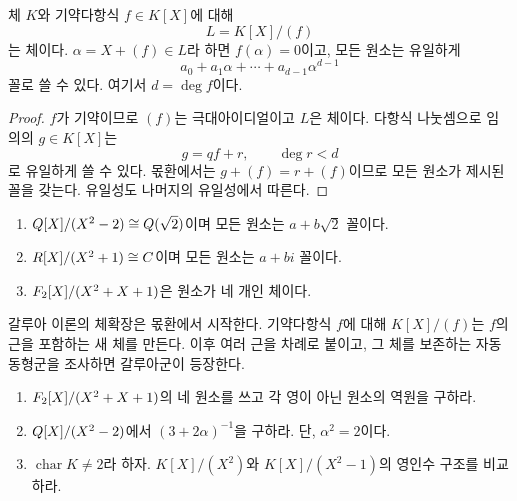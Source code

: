 \begin{theorem}
체 $K$와 기약다항식 $f\in K[X]$에 대해
\[
  L=K[X]/(f)
\]
는 체이다. $\alpha=X+(f)\in L$라 하면 $f(\alpha)=0$이고, 모든 원소는 유일하게
\[
  a_0+a_1\alpha+\cdots+a_{d-1}\alpha^{d-1}
\]
꼴로 쓸 수 있다. 여기서 $d=\deg f$이다.
\end{theorem}

\begin{proof}
$f$가 기약이므로 $(f)$는 극대아이디얼이고 $L$은 체이다. 다항식 나눗셈으로 임의의 $g\in K[X]$는
\[
  g=qf+r,\qquad \deg r<d
\]
로 유일하게 쓸 수 있다. 몫환에서는 $g+(f)=r+(f)$이므로 모든 원소가 제시된 꼴을 갖는다. 유일성도 나머지의 유일성에서 따른다.
\end{proof}

\begin{example}
\begin{enumerate}[label=(\alph*)]
  \item $Q[X]/(X^2-2)\cong Q(\sqrt2)$이며 모든 원소는 $a+b\sqrt2$ 꼴이다.
  \item $R[X]/(X^2+1)\cong C$이며 모든 원소는 $a+bi$ 꼴이다.
  \item $F_2[X]/(X^2+X+1)$은 원소가 네 개인 체이다.
\end{enumerate}
\end{example}

\begin{keyidea}
갈루아 이론의 체확장은 몫환에서 시작한다. 기약다항식 $f$에 대해 $K[X]/(f)$는 $f$의 근을 포함하는 새 체를 만든다. 이후 여러 근을 차례로 붙이고, 그 체를 보존하는 자동동형군을 조사하면 갈루아군이 등장한다.
\end{keyidea}

\begin{checkpoint}
\begin{enumerate}[label=(\alph*)]
  \item $F_2[X]/(X^2+X+1)$의 네 원소를 쓰고 각 영이 아닌 원소의 역원을 구하라.
  \item $Q[X]/(X^2-2)$에서 $(3+2\alpha)^{-1}$을 구하라. 단, $\alpha^2=2$이다.
  \item $\operatorname{char}K\ne2$라 하자. $K[X]/(X^2)$와 $K[X]/(X^2-1)$의 영인수 구조를 비교하라.
\end{enumerate}
\end{checkpoint}
